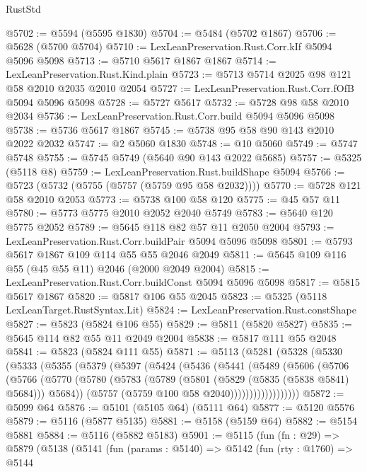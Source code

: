 \begin{lexlean}{RustStd}
\begin{coremodule}
{\begin{coremodule}
{{{{{{{{{{{{{{{{{{{{{{{{{{{{{{{@5702 := @5594 (@5595 @1830)
@5704 := @5484 (@5702 @1867)
@5706 := @5628 (@5700 @5704)
@5710 := LexLeanPreservation.Rust.Corr.kIf @5094 @5096 @5098
@5713 := @5710 @5617 @1867 @1867
@5714 := LexLeanPreservation.Rust.Kind.plain
@5723 := @5713 @5714 @2025 @98 @121 @58 @2010 @2035 @2010 @2054
@5727 := LexLeanPreservation.Rust.Corr.fOfB @5094 @5096 @5098
@5728 := @5727 @5617
@5732 := @5728 @98 @58 @2010 @2034
@5736 := LexLeanPreservation.Rust.Corr.build @5094 @5096 @5098
@5738 := @5736 @5617 @1867
@5745 := @5738 @95 @58 @90 @143 @2010 @2022 @2032
@5747 := @2 @5060 @1830
@5748 := @10 @5060
@5749 := @5747 @5748
@5755 := @5745 @5749 (@5640 @90 @143 @2022 @5685)
@5757 := @5325 (@5118 @8)
@5759 := LexLeanPreservation.Rust.buildShape @5094
@5766 := @5723 (@5732 (@5755 (@5757 (@5759 @95 @58 @2032))))
@5770 := @5728 @121 @58 @2010 @2053
@5773 := @5738 @100 @58 @120
@5775 := @45 @57 @11
@5780 := @5773 @5775 @2010 @2052 @2040 @5749
@5783 := @5640 @120 @5775 @2052
@5789 := @5645 @118 @82 @57 @11 @2050 @2004
@5793 := LexLeanPreservation.Rust.Corr.buildPair @5094 @5096 @5098
@5801 := @5793 @5617 @1867 @109 @114 @55 @55 @2046 @2049
@5811 := @5645 @109 @116 @55 (@45 @55 @11) @2046 (@2000 @2049 @2004)
@5815 := LexLeanPreservation.Rust.Corr.buildConst @5094 @5096 @5098
@5817 := @5815 @5617 @1867
@5820 := @5817 @106 @55 @2045
@5823 := @5325 (@5118 LexLeanTarget.RustSyntax.Lit)
@5824 := LexLeanPreservation.Rust.constShape
@5827 := @5823 (@5824 @106 @55)
@5829 := @5811 (@5820 @5827)
@5835 := @5645 @114 @82 @55 @11 @2049 @2004
@5838 := @5817 @111 @55 @2048
@5841 := @5823 (@5824 @111 @55)
@5871 := @5113
    (@5281
      (@5328
        (@5330
          (@5333
            (@5355
              (@5379
                (@5397
                  (@5424
                    (@5436
                      (@5441
                        (@5489
                          (@5606
                            (@5706
                              (@5766
                                (@5770
                                  (@5780
                                    (@5783
                                      (@5789 (@5801 (@5829 (@5835 (@5838 @5841) @5684))) @5684))
                                    (@5757 (@5759 @100 @58 @2040))))))))))))))))))
@5872 := @5099 @64
@5876 := @5101 (@5105 @64) (@5111 @64)
@5877 := @5120 @5576
@5879 := @5116 (@5877 @5135)
@5881 := @5158 (@5159 @64)
@5882 := @5154 @5881
@5884 := @5116 (@5882 @5183)
@5901 := @5115
    (fun (fn : @29) =>
    @5879
      (@5138
        (@5141
          (fun (params : @5140) =>
          @5142
            (fun (rty : @1760) =>
            @5144
}}}}}}}}}}}}}}}}}}}}}}}}}}}}}}}
\end{coremodule}}
\end{coremodule}
\end{lexlean}
